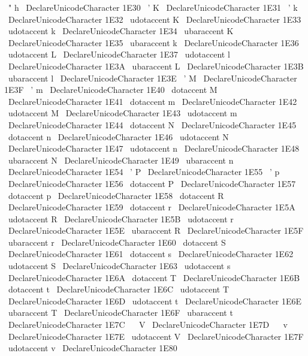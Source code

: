 {{{{{{}
{
\
"
h
}
\
DeclareUnicodeCharacter
{
1E30
}
{
\
'
K
}
\
DeclareUnicodeCharacter
{
1E31
}
{
\
'
k
}
\
DeclareUnicodeCharacter
{
1E32
}
{
\
udotaccent
{
K
}
}
\
DeclareUnicodeCharacter
{
1E33
}
{
\
udotaccent
{
k
}
}
\
DeclareUnicodeCharacter
{
1E34
}
{
\
ubaraccent
{
K
}
}
\
DeclareUnicodeCharacter
{
1E35
}
{
\
ubaraccent
{
k
}
}
\
DeclareUnicodeCharacter
{
1E36
}
{
\
udotaccent
{
L
}
}
\
DeclareUnicodeCharacter
{
1E37
}
{
\
udotaccent
{
l
}
}
\
DeclareUnicodeCharacter
{
1E3A
}
{
\
ubaraccent
{
L
}
}
\
DeclareUnicodeCharacter
{
1E3B
}
{
\
ubaraccent
{
l
}
}
\
DeclareUnicodeCharacter
{
1E3E
}
{
\
'
M
}
\
DeclareUnicodeCharacter
{
1E3F
}
{
\
'
m
}
\
DeclareUnicodeCharacter
{
1E40
}
{
\
dotaccent
{
M
}
}
\
DeclareUnicodeCharacter
{
1E41
}
{
\
dotaccent
{
m
}
}
\
DeclareUnicodeCharacter
{
1E42
}
{
\
udotaccent
{
M
}
}
\
DeclareUnicodeCharacter
{
1E43
}
{
\
udotaccent
{
m
}
}
\
DeclareUnicodeCharacter
{
1E44
}
{
\
dotaccent
{
N
}
}
\
DeclareUnicodeCharacter
{
1E45
}
{
\
dotaccent
{
n
}
}
\
DeclareUnicodeCharacter
{
1E46
}
{
\
udotaccent
{
N
}
}
\
DeclareUnicodeCharacter
{
1E47
}
{
\
udotaccent
{
n
}
}
\
DeclareUnicodeCharacter
{
1E48
}
{
\
ubaraccent
{
N
}
}
\
DeclareUnicodeCharacter
{
1E49
}
{
\
ubaraccent
{
n
}
}
\
DeclareUnicodeCharacter
{
1E54
}
{
\
'
P
}
\
DeclareUnicodeCharacter
{
1E55
}
{
\
'
p
}
\
DeclareUnicodeCharacter
{
1E56
}
{
\
dotaccent
{
P
}
}
\
DeclareUnicodeCharacter
{
1E57
}
{
\
dotaccent
{
p
}
}
\
DeclareUnicodeCharacter
{
1E58
}
{
\
dotaccent
{
R
}
}
\
DeclareUnicodeCharacter
{
1E59
}
{
\
dotaccent
{
r
}
}
\
DeclareUnicodeCharacter
{
1E5A
}
{
\
udotaccent
{
R
}
}
\
DeclareUnicodeCharacter
{
1E5B
}
{
\
udotaccent
{
r
}
}
\
DeclareUnicodeCharacter
{
1E5E
}
{
\
ubaraccent
{
R
}
}
\
DeclareUnicodeCharacter
{
1E5F
}
{
\
ubaraccent
{
r
}
}
\
DeclareUnicodeCharacter
{
1E60
}
{
\
dotaccent
{
S
}
}
\
DeclareUnicodeCharacter
{
1E61
}
{
\
dotaccent
{
s
}
}
\
DeclareUnicodeCharacter
{
1E62
}
{
\
udotaccent
{
S
}
}
\
DeclareUnicodeCharacter
{
1E63
}
{
\
udotaccent
{
s
}
}
\
DeclareUnicodeCharacter
{
1E6A
}
{
\
dotaccent
{
T
}
}
\
DeclareUnicodeCharacter
{
1E6B
}
{
\
dotaccent
{
t
}
}
\
DeclareUnicodeCharacter
{
1E6C
}
{
\
udotaccent
{
T
}
}
\
DeclareUnicodeCharacter
{
1E6D
}
{
\
udotaccent
{
t
}
}
\
DeclareUnicodeCharacter
{
1E6E
}
{
\
ubaraccent
{
T
}
}
\
DeclareUnicodeCharacter
{
1E6F
}
{
\
ubaraccent
{
t
}
}
\
DeclareUnicodeCharacter
{
1E7C
}
{
\
~
V
}
\
DeclareUnicodeCharacter
{
1E7D
}
{
\
~
v
}
\
DeclareUnicodeCharacter
{
1E7E
}
{
\
udotaccent
{
V
}
}
\
DeclareUnicodeCharacter
{
1E7F
}
{
\
udotaccent
{
v
}
}
\
DeclareUnicodeCharacter
{
1E80
}
{
}}}}}}
